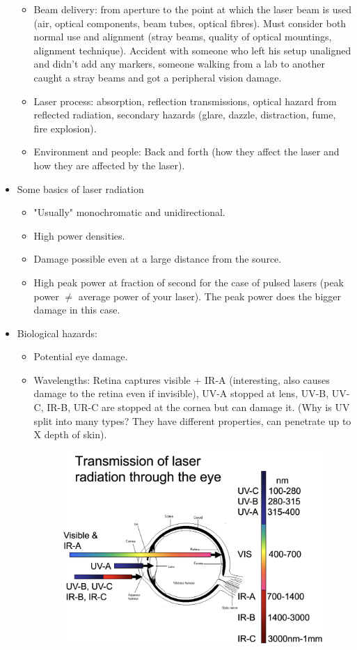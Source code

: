 \documentclass[a4paper,11pt]{article}
\begin{document}
\begin{itemize}
\begin{itemize}
		\item Beam delivery: from aperture to the point at which the laser beam is used (air, optical components, beam tubes, optical fibres). Must consider both normal use and alignment (stray beams, quality of optical mountings, alignment technique). Accident with someone who left his setup unaligned and didn't add any markers, someone walking from a lab to another caught a stray beams and got a peripheral vision damage.
		\item Laser process: absorption, reflection transmissions, optical hazard from reflected radiation, secondary hazards (glare, dazzle, distraction, fume, fire explosion).
		\item Environment and people: Back and forth (how they affect the laser and how they are affected by the laser).
	\end{itemize}
\item Some basics of laser radiation
	\begin{itemize}
		\item "Usually" monochromatic and unidirectional.
		\item High power densities.
		\item Damage possible even at a large distance from the source.
		\item High peak power at fraction of second for the case of pulsed lasers (peak power $\neq$ average power of your laser). The peak power does the bigger damage in this case.
	\end{itemize}
\item Biological hazards:
\begin{itemize}
	\item Potential eye damage. 
	\item Wavelengths: Retina captures visible + IR-A (interesting, also causes damage to the retina even if invisible), UV-A stopped at lens, UV-B, UV-C, IR-B, UR-C are stopped at the cornea but can damage it. (Why is UV split into many types? They have different properties, can penetrate up to X depth of skin).
	\begin{figure}[h]
		\centering
		\includegraphics[width=.8\linewidth]{figures/eye.png}

\end{figure}
\end{itemize}
\end{itemize}
\end{document}
